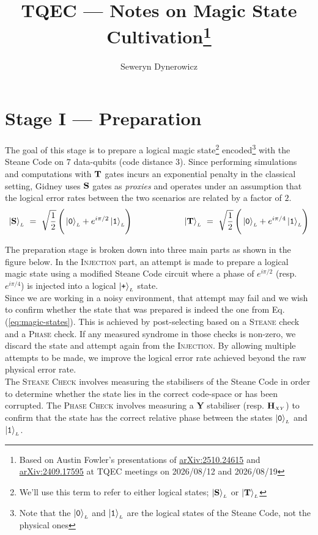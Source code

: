 \documentclass{article}
\title{TQEC --- Notes on Magic State Cultivation\thanks{Based on Austin Fowler's presentations of \texorpdfstring{\href{https://arxiv.org/abs/arXiv:2510.24615}{arXiv:2510.24615}}{arXiv:2510.24615} and \texorpdfstring{\href{https://arxiv.org/abs/2510.24615}{arXiv:2409.17595}}{arXiv:2409.17595} at TQEC meetings on 2026/08/12 and 2026/08/19}}
\author{Seweryn Dynerowicz}
\newcommand{\sub}[1]{_{\scriptscriptstyle #1}}
\newcommand{\Op}[1]{{\bf #1}}
\newcommand{\kett}[1]{\ket{\mbox{\tt #1}}}
\begin{document}
	\maketitle

	\section{Stage I --- Preparation}
	
	The goal of this stage is to prepare a logical magic state\footnote{We'll use this term to refer to either logical states; $\ket{\Op{S}}\sub{L}$ or $\ket{\Op{T}}\sub{L}$} encoded\footnote{Note that the $\kett{0}\sub{L}$ and $\kett{1}\sub{L}$ are the logical states of the Steane Code, not the physical ones} with the Steane Code on $7$ data-qubits (code distance $3$). Since performing simulations and computations with $\Op{T}$ gates incurs an exponential penalty in the classical setting, Gidney uses $\Op{S}$ gates as {\it proxies} and operates under an assumption that the logical error rates between the two scenarios are related by a factor of $2$.
	\begin{equation}
		\ket{\Op{S}}\sub{L} ~=~
			\sqrt{\frac{1}{2}}\left(\vphantom{\sqrt{\frac{1}{2}}}
				\kett{0}\sub{L} + e^{i\pi/2}\kett{1}\sub{L}
			\right)
		\qquad\qquad\qquad
		\ket{\Op{T}}\sub{L} ~=~
			\sqrt{\frac{1}{2}}\left(\vphantom{\sqrt{\frac{1}{2}}}
				\kett{0}\sub{L} + e^{i\pi/4}\kett{1}\sub{L}
			\right)
		\label{eq:magic-states}
	\end{equation}

	The preparation stage is broken down into three main parts as shown in the figure below. In the \textsc{Injection} part, an attempt is made to prepare a logical magic state using a modified Steane Code circuit where a phase of $e^{i\pi/2}$ (resp. $e^{i\pi/4}$) is injected into a logical $\kett{+}\sub{L}$ state. \\

	Since we are working in a noisy environment, that attempt may fail and we wish to confirm whether the state that was prepared is indeed the one from Eq. (\ref{eq:magic-states}). This is achieved by post-selecting based on a \textsc{Steane} check and a \textsc{Phase} check. If any measured syndrome in those checks is non-zero, we discard the state and attempt again from the \textsc{Injection}. By allowing multiple attempts to be made, we improve the logical error rate achieved beyond the raw physical error rate. \\
	
	The \textsc{Steane Check} involves measuring the stabilisers of the Steane Code in order to determine whether the state lies in the correct code-space or has been corrupted. The \textsc{Phase Check} involves measuring a \Op{Y} stabiliser (resp. $\Op{H}\sub{XY}$) to confirm that the state has the correct relative phase between the states $\kett{0}\sub{L}$ and $\kett{1}\sub{L}$.
\end{document}
